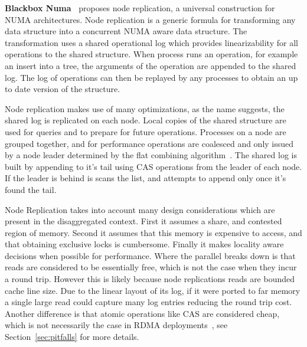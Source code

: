 \textbf{Blackbox Numa~\cite{black-box-numa}} proposes node replication, a
universal construction for NUMA architectures. Node replication is a generic
formula for transforming any data structure into a concurrent NUMA aware data
structure. The transformation uses a shared operational log which provides
linearizability for all operations to the shared structure. When process runs an
operation, for example an insert into a tree, the arguments of the operation are
appended to the shared log. The log of operations can then be replayed by any
processes to obtain an up to date version of the structure.

Node replication makes use of many optimizations, as the name suggests, the
shared log is replicated on each node. Local copies of the shared structure are
used for queries and to prepare for future operations. Processes on a node are
grouped together, and for performance operations are coalesced and only issued
by a node leader determined by the flat combining algorithm~\cite{flat-combine}.
The shared log is built by appending to it's tail using CAS operations from the
leader of each node. If the leader is behind is scans the list, and attempts to
append only once it's found the tail.

Node Replication takes into account many design considerations which are present
in the disaggregated context. First it assumes a share, and contested region of
memory. Second it assumes that this memory is expensive to access, and that
obtaining exclusive locks is cumbersome. Finally it makes locality aware
decisions when possible for performance. Where the parallel breaks down is that
reads are considered to be essentially free, which is not the case when they
incur a round trip. However this is likely because node replications reads are
bounded cache line size. Due to the linear layout of its log, if it were ported
to far memory a single large read could capture many log entries reducing the
round trip cost.  Another difference is that atomic operations like CAS are
considered cheap, which is not necessarily the case in RDMA
deployments~\cite{design-guidelines}, see Section~\ref{sec:pitfalls} for more
details. 


